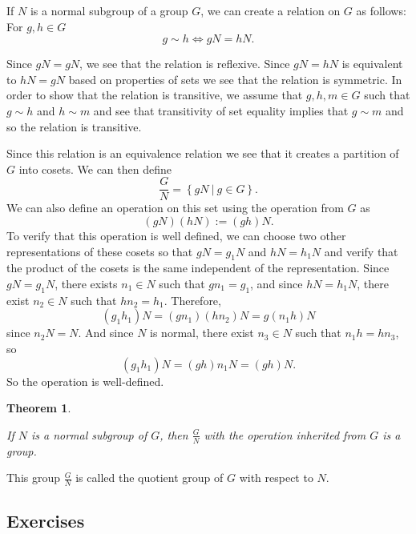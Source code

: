 \documentclass[
]{book}
\newtheorem{theorem}{Theorem}[chapter]
\theoremstyle{definition}
\theoremstyle{definition}
\theoremstyle{definition}
\theoremstyle{definition}
\theoremstyle{remark}
\begin{document}
If \(N\) is a normal subgroup of a group \(G\), we can create a relation on \(G\) as follows: For \(g,h\in G\)
\[g \sim h \Leftrightarrow gN=hN.\]

Since \(gN=gN\), we see that the relation is reflexive. Since \(gN=hN\) is equivalent to \(hN=gN\) based on properties of sets we see that the relation is symmetric. In order to show that the relation is transitive, we assume that \(g,h,m\in G\) such that \(g \sim h\) and \(h\sim m\) and see that transitivity of set equality implies that \(g\sim m\) and so the relation is transitive.

Since this relation is an equivalence relation we see that it creates a partition of \(G\) into cosets. We can then define
\[\frac{G}{N} = \left\{ gN \: \vert \: g\in G\right\}.\]
We can also define an operation on this set using the operation from \(G\) as
\[ (gN)(hN) := (gh)N.\] To verify that this operation is well defined, we can choose two other representations of these cosets so that \(gN=g_1 N\) and \(hN=h_1N\) and verify that the product of the cosets is the same independent of the representation. Since \(gN=g_1N\), there exists \(n_1\in N\) such that \(gn_1 =g_1\), and since \(hN=h_1N\), there exist \(n_2\in N\) such that \(hn_2=h_1\). Therefore,
\[(g_1 h_1)N= (g n_1)(h n_2) N = g (n_1 h)N\] since \(n_2N=N\). And since \(N\) is normal, there exist \(n_3\in N\) such that \(n_1 h= h n_3\), so
\[(g_1 h_1)N= (gh)n_1 N = (gh)N.\] So the operation is well-defined.

\begin{theorem}
\protect\hypertarget{thm:unlabeled-div-224}{}\label{thm:unlabeled-div-224}

If \(N\) is a normal subgroup of \(G\), then \(\frac{G}{N}\) with the operation inherited from \(G\) is a group.

\end{theorem}

This group \(\frac{G}{N}\) is called the quotient group of \(G\) with respect to \(N\).

\hypertarget{exercises-48}{%
\subsection{Exercises}\label{exercises-48}}
\end{document}
